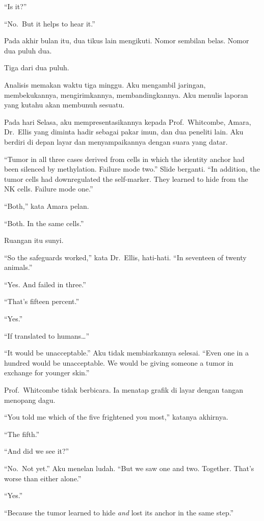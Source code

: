 \documentclass[11pt,twoside,openany]{book}
\makeatletter
\newcommand{\scenebreak}{\par\vspace{0.9em}{\centering\textsc{*\hspace{0.7em}*\hspace{0.7em}*}\par}\vspace{0.9em}\@afterindentfalse\@afterheading}
\makeatother
\begin{document}
``Is it?''

``No.~But it helps to hear it.''

Pada akhir bulan itu, dua tikus lain mengikuti. Nomor sembilan belas. Nomor dua puluh dua.

Tiga dari dua puluh.

\scenebreak
Analisis memakan waktu tiga minggu. Aku mengambil jaringan, membekukannya, mengirimkannya, membandingkannya. Aku menulis laporan yang kutahu akan membunuh sesuatu.

Pada hari Selasa, aku mempresentasikannya kepada Prof.~Whitcombe, Amara, Dr.~Ellis yang diminta hadir sebagai pakar imun, dan dua peneliti lain. Aku berdiri di depan layar dan menyampaikannya dengan suara yang datar.

``Tumor in all three cases derived from cells in which the identity anchor had been silenced by methylation. Failure mode two.'' Slide berganti. ``In addition, the tumor cells had downregulated the self-marker. They learned to hide from the NK cells. Failure mode one.''

``Both,'' kata Amara pelan.

``Both. In the same cells.''

Ruangan itu sunyi.

``So the safeguards worked,'' kata Dr.~Ellis, hati-hati. ``In seventeen of twenty animals.''

``Yes. And failed in three.''

``That's fifteen percent.''

``Yes.''

``If translated to humans\ldots{}''

``It would be unacceptable.'' Aku tidak membiarkannya selesai. ``Even one in a hundred would be unacceptable. We would be giving someone a tumor in exchange for younger skin.''

Prof.~Whitcombe tidak berbicara. Ia menatap grafik di layar dengan tangan menopang dagu.

``You told me which of the five frightened you most,'' katanya akhirnya.

``The fifth.''

``And did we see it?''

``No.~Not yet.'' Aku menelan ludah. ``But we saw one and two. Together. That's worse than either alone.''

``Yes.''

``Because the tumor learned to hide \emph{and} lost its anchor in the same step.''
\end{document}
